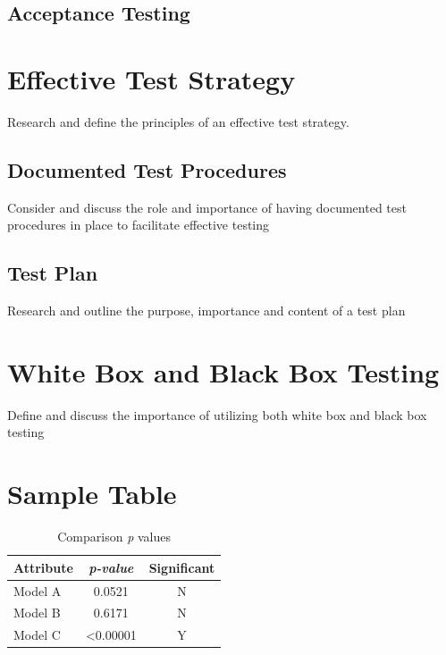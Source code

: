 \documentclass[12pt]{article}
\begin{document}
\subsection{Acceptance Testing}



\section{Effective Test Strategy}
Research and define the principles of an effective test strategy.

\subsection{Documented Test Procedures}
Consider and discuss the role and importance of having documented test procedures in place to facilitate effective testing

\subsection{Test Plan}
Research and outline the purpose, importance and content of a test plan



\section{White Box and Black Box Testing}
Define and discuss the importance of utilizing both white box and black box testing



\pagebreak
\section{Sample Table}
\begin{table}[ht!]
\centering
    
	\caption{Comparison \textit{p} values}
	\begin{tabular}{ |l|c|c|}	
		\hline		
		\textbf{Attribute} & \textbf{\textit{p-value}} & \textbf{Significant} \\ \hline
		Model A	 & 0.0521 & N \\ \hline
		Model B  & 0.6171 & N \\ \hline 
		Model C  & <0.00001 & Y \\ \hline 
	\end{tabular}
	\label{tab:pvalues}
\end{table} 
\end{document}
